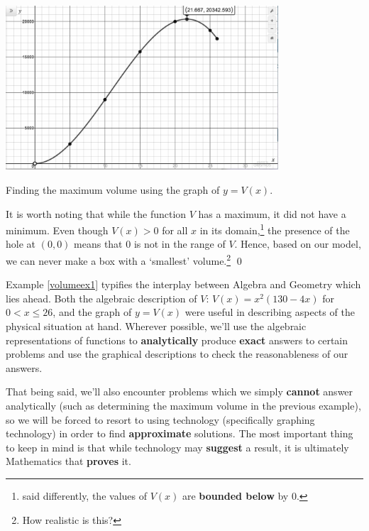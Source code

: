 \documentclass{ximera}
\begin{document}
\begin{ex}
\begin{enumerate}
\begin{center}

\includegraphics[width=4in]{./FunctionsandtheirRepresentationsGraphics/VolumeEx02.jpg} 

Finding the maximum volume using the graph of $y = V(x)$.

\end{center}

\pagebreak

It is worth noting that while the function $V$ has a maximum, it did not have a minimum.  Even though $V(x)>0$ for all $x$ in its domain,\footnote{said differently, the values of $V(x)$ are \textbf{bounded below} by $0$.} the presence of the hole at $(0,0)$ means that $0$ is not in the range of $V$.  Hence, based on our model, we can never make a box with a  `smallest' volume.\footnote{How realistic is this?}  \qed

\end{enumerate}
\end{ex}

\medskip

Example \ref{volumeex1} typifies the interplay between Algebra and Geometry which lies ahead.  Both the algebraic description of  $V$: $V(x) = x^2 (130 - 4x)$ for $0 < x \leq 26$, and the graph of $y=V(x)$ were useful in describing aspects of the physical situation at hand.  Wherever possible, we'll use the algebraic representations of functions to \textbf{analytically} produce \textbf{exact} answers to certain problems and use the graphical descriptions to check the reasonableness of our answers. 

\medskip

That being said, we'll also encounter problems which we simply \textbf{cannot} answer analytically (such as determining the maximum volume in the previous example), so we will be forced to resort to using technology (specifically graphing technology) in order to find \textbf{approximate} solutions.  The most important thing to keep in mind is that while technology may \textbf{suggest} a result, it is ultimately Mathematics that \textbf{proves} it. 
\end{document}
